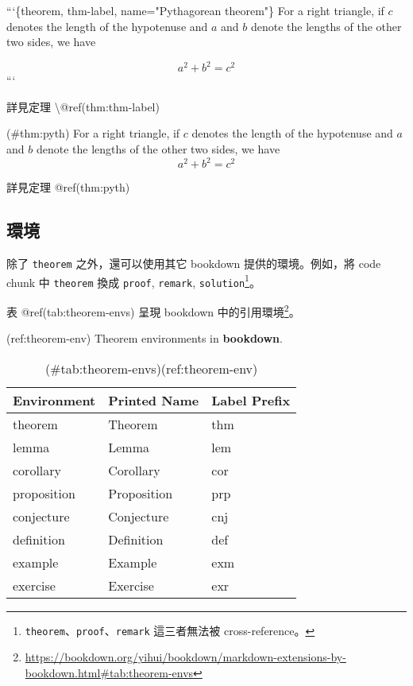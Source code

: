 \documentclass[oneside]{book}
\newenvironment{Shaded}{\begin{snugshade}}{\end{snugshade}}
\newcommand{\BaseNTok}[1]{\textcolor[rgb]{0.00,0.00,0.81}{#1}}
\newcommand{\NormalTok}[1]{#1}
\renewcommand{\href}[2]{#2\footnote{\url{#1}}}
\begin{document}
\begin{Shaded}
\begin{Highlighting}[]
\BaseNTok{```\{theorem, thm-label, name="Pythagorean theorem"\}}
\BaseNTok{For a right triangle, if $c$ denotes the length of the hypotenuse}
\BaseNTok{and $a$ and $b$ denote the lengths of the other two sides, we have}

\BaseNTok{$$a^2 + b^2 = c^2$$}
\BaseNTok{```}

\NormalTok{詳見定理 \textbackslash{}@ref(thm:thm-label)}
\end{Highlighting}
\end{Shaded}

\BeginKnitrBlock{theorem}\iffalse{-91-80-121-116-104-97-103-111-114-101-97-110-32-116-104-101-111-114-101-109-93-}\fi{}

\protect\hypertarget{thm:pyth}{}{(\#thm:pyth) \iffalse (Pythagorean theorem) \fi{} }For a right triangle, if \(c\) denotes the length of the hypotenuse
and \(a\) and \(b\) denote the lengths of the other two sides, we have
\[a^2 + b^2 = c^2\]


詳見定理 @ref(thm:pyth)

\hypertarget{environment}{%
\subsection{環境}\label{environment}}

除了 \texttt{theorem} 之外，還可以使用其它 bookdown 提供的環境。例如，將 code chunk 中 \texttt{theorem} 換成 \texttt{proof}, \texttt{remark}, \texttt{solution}\footnote{\texttt{theorem}、\texttt{proof}、\texttt{remark} 這三者無法被 cross-reference。}。

表 @ref(tab:theorem-envs) 呈現 bookdown 中的\href{https://bookdown.org/yihui/bookdown/markdown-extensions-by-bookdown.html\#tab:theorem-envs}{引用環境}。

(ref:theorem-env) Theorem environments in \textbf{bookdown}.

\begin{table}

\caption{(\#tab:theorem-envs)(ref:theorem-env)}
\centering
\begin{tabular}[t]{lll}
\toprule
Environment & Printed Name & Label Prefix\\
\midrule
theorem & Theorem & thm\\
lemma & Lemma & lem\\
corollary & Corollary & cor\\
proposition & Proposition & prp\\
conjecture & Conjecture & cnj\\
\addlinespace
definition & Definition & def\\
example & Example & exm\\
exercise & Exercise & exr\\
\bottomrule
\end{tabular}
\end{table}
\end{document}
